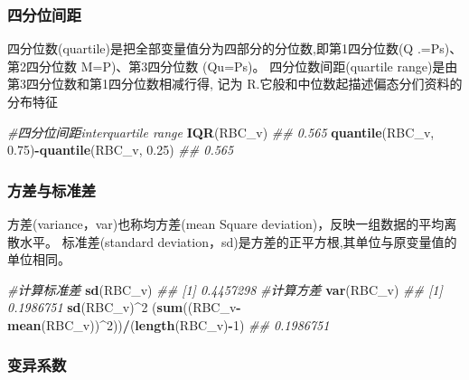 \documentclass[
]{article}
\newenvironment{Shaded}{\begin{snugshade}}{\end{snugshade}}
\newcommand{\CommentTok}[1]{\textcolor[rgb]{0.56,0.35,0.01}{\textit{#1}}}
\newcommand{\DecValTok}[1]{\textcolor[rgb]{0.00,0.00,0.81}{#1}}
\newcommand{\FloatTok}[1]{\textcolor[rgb]{0.00,0.00,0.81}{#1}}
\newcommand{\KeywordTok}[1]{\textcolor[rgb]{0.13,0.29,0.53}{\textbf{#1}}}
\newcommand{\NormalTok}[1]{#1}
\newcommand{\OperatorTok}[1]{\textcolor[rgb]{0.81,0.36,0.00}{\textbf{#1}}}
\begin{document}
\hypertarget{ux56dbux5206ux4f4dux95f4ux8ddd}{%
\subsubsection{四分位间距}\label{ux56dbux5206ux4f4dux95f4ux8ddd}}

四分位数(quartile)是把全部变量值分为四部分的分位数,即第1四分位数(Q .=Ps)、第2四分位数 M=P)、第3四分位数 (Qu=Ps)。 四分位数间距(quartile range)是由第3四分位数和第1四分位数相减行得,
记为 R.它般和中位数起描述偏态分们资料的分布特征

\begin{Shaded}
\begin{Highlighting}[]
\CommentTok{#四分位间距interquartile range}
\KeywordTok{IQR}\NormalTok{(RBC_v)}
\CommentTok{##  0.565}
\KeywordTok{quantile}\NormalTok{(RBC_v, }\FloatTok{0.75}\NormalTok{)}\OperatorTok{-}\KeywordTok{quantile}\NormalTok{(RBC_v, }\FloatTok{0.25}\NormalTok{)}
\CommentTok{## 0.565}
\end{Highlighting}
\end{Shaded}

\hypertarget{ux65b9ux5deeux4e0eux6807ux51c6ux5dee}{%
\subsubsection{方差与标准差}\label{ux65b9ux5deeux4e0eux6807ux51c6ux5dee}}

方差(variance，var)也称均方差(mean Square deviation)，反映一组数据的平均离散水平。
标准差(standard deviation，sd)是方差的正平方根,其单位与原变量值的单位相同。

\begin{Shaded}
\begin{Highlighting}[]
\CommentTok{#计算标准差}
\KeywordTok{sd}\NormalTok{(RBC_v)}
\CommentTok{## [1] 0.4457298}
\CommentTok{#计算方差}
\KeywordTok{var}\NormalTok{(RBC_v)}
\CommentTok{## [1] 0.1986751}
\KeywordTok{sd}\NormalTok{(RBC_v)}\OperatorTok{^}\DecValTok{2}
\NormalTok{(}\KeywordTok{sum}\NormalTok{((RBC_v}\OperatorTok{-}\KeywordTok{mean}\NormalTok{(RBC_v))}\OperatorTok{^}\DecValTok{2}\NormalTok{))}\OperatorTok{/}\NormalTok{(}\KeywordTok{length}\NormalTok{(RBC_v)}\OperatorTok{-}\DecValTok{1}\NormalTok{)}
\CommentTok{## 0.1986751}
\end{Highlighting}
\end{Shaded}

\hypertarget{ux53d8ux5f02ux7cfbux6570}{%
\subsubsection{变异系数}\label{ux53d8ux5f02ux7cfbux6570}}
\end{document}
